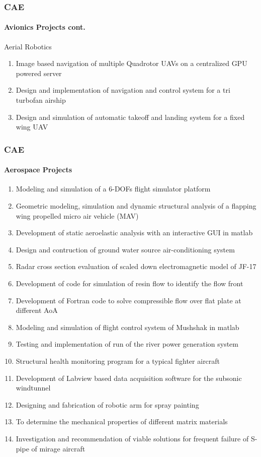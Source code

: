 \begin{frame}
\frametitle{CAE}
\framesubtitle{Avionics Projects \tiny cont.}
\mypagenum{}
Aerial Robotics
\begin{enumerate}\scriptsize
\item Image based navigation of multiple Quadrotor UAVs on a centralized GPU powered server
\item Design and implementation of navigation and control system for a tri turbofan airship
\item Design and simulation of automatic takeoff and landing system for a fixed wing UAV
\end{enumerate}
\end{frame}







\begin{frame}
\frametitle{CAE}
\framesubtitle{Aerospace Projects}
\mypagenum{}
\begin{changemargin}{-0.3in}{0in}
\begin{enumerate}\scriptsize
\item {\color{blue}Modeling and simulation of a 6-DOFs flight simulator platform}
\item {\color{blue}Geometric modeling, simulation and dynamic structural analysis of a flapping wing propelled micro air vehicle (MAV)}
\item Development of static aeroelastic analysis with an interactive GUI in matlab
\item Design and contruction of ground water source air-conditioning system
\item Radar cross section evaluation of scaled down electromagnetic model of JF-17
\item Development of code for simulation of resin flow to identify the flow front
\item Development of Fortran code to solve compressible flow over flat plate at different AoA
\item {\color{blue}Modeling and simulation of flight control system of Mushshak in matlab}
\item Testing and implementation of run of the river power generation system
\item Structural health monitoring program for a typical fighter aircraft
\item Development of Labview based data acquisition software for the subsonic windtunnel
\item {\color{blue}Designing and fabrication of robotic arm for spray painting}
\item To determine the mechanical properties of different matrix materials
\item Investigation and recommendation of viable solutions for frequent failure of S-pipe of mirage aircraft
\end{enumerate}
\end{changemargin}
\end{frame}

